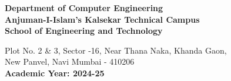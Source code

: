 \begin{center}
\vspace{0.2cm}

\linespread{1.0}
\textbf{\Large Department of Computer Engineering\\
\normalsize Anjuman-I-Islam's Kalsekar Technical Campus\\
\normalsize School of Engineering and Technology\\
}

\linespread{1.0}\normalsize{Plot No. 2 \& 3, Sector -16, Near Thana Naka, Khanda Gaon,\\
New Panvel, Navi Mumbai - 410206}\\

\vspace{0.3cm}
\textbf{\large Academic Year: 2024-25}\\

\thispagestyle{empty}
\end{center}
